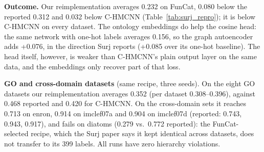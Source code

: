 \documentclass[preprint,12pt]{elsarticle}
\begin{document}
\begin{table}[htbp]
\centering
\caption{Surj as reported and as reimplemented (test AUPRC, FunCat,
mean $\pm$ std over 10 seeds).  ``One-hot'' is the same network without
ontology learning (Surj's Table~5).  All our runs have zero hierarchy
violations.}
\label{tab:surj_repro}
\end{table}

\textbf{Outcome.}  Our reimplementation averages 0.232 on FunCat,
0.080 below the reported 0.312 and 0.032 below C-HMCNN
(Table~\ref{tab:surj_repro}); it is below C-HMCNN on every dataset.  The
ontology embeddings do help the cosine head: the same network with
one-hot labels averages 0.156, so the graph autoencoder adds +0.076,
in the direction Surj reports (+0.085 over its one-hot baseline).  The
head itself, however, is weaker than C-HMCNN's plain output layer on
the same data, and the embeddings only recover part of that loss.

\textbf{GO and cross-domain datasets} (same recipe, three seeds).  On
the eight GO datasets our reimplementation averages 0.352 (per dataset
0.308--0.396), against 0.468 reported and 0.420 for C-HMCNN.  On the
cross-domain sets it reaches 0.713 on enron, 0.914 on imclef07a and
0.904 on imclef07d (reported: 0.743, 0.943, 0.917), and fails on
diatoms (0.279 vs.\ 0.772 reported): the FunCat-selected recipe, which the
Surj paper says it kept identical across datasets, does not transfer to
its 399 labels.  All runs have zero hierarchy violations.
\end{document}

